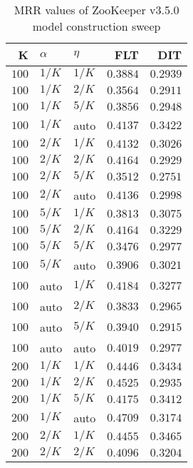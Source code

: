 
\begin{table}
\begin{spacing}{1.2}
\centering
\caption{MRR values of ZooKeeper v3.5.0 model construction sweep}
\label{table:zookeeper_model_sweep}
\vspace{0.2em}
\parbox{.45\linewidth}{\centering \begin{tabular}{rll|rr}
\toprule
    K &  $\alpha$ &    $\eta$ & FLT &   DIT \\
\midrule
$100$ &  $1/K$ &  $1/K$ &         $0.3884$ & $0.2939$ \\
$100$ &  $1/K$ &  $2/K$ &         $0.3564$ & $0.2911$ \\
$100$ &  $1/K$ &  $5/K$ &         $0.3856$ & $0.2948$ \\
$100$ &  $1/K$ &   auto &         $0.4137$ & $0.3422$ \\
$100$ &  $2/K$ &  $1/K$ &         $0.4132$ & $0.3026$ \\
$100$ &  $2/K$ &  $2/K$ &         $0.4164$ & $0.2929$ \\
$100$ &  $2/K$ &  $5/K$ &         $0.3512$ & $0.2751$ \\
$100$ &  $2/K$ &   auto &         $0.4136$ & $0.2998$ \\
$100$ &  $5/K$ &  $1/K$ &         $0.3813$ & $0.3075$ \\
$100$ &  $5/K$ &  $2/K$ &         $0.4164$ & $0.3229$ \\
$100$ &  $5/K$ &  $5/K$ &         $0.3476$ & $0.2977$ \\
$100$ &  $5/K$ &   auto &         $0.3906$ & $0.3021$ \\
$100$ &   auto &  $1/K$ &         $0.4184$ & $0.3277$ \\
$100$ &   auto &  $2/K$ &         $0.3833$ & $0.2965$ \\
$100$ &   auto &  $5/K$ &         $0.3940$ & $0.2915$ \\
$100$ &   auto &   auto &         $0.4019$ & $0.2977$ \\
$200$ &  $1/K$ &  $1/K$ &         $0.4446$ & $0.3434$ \\
$200$ &  $1/K$ &  $2/K$ &         $0.4525$ & $0.2935$ \\
$200$ &  $1/K$ &  $5/K$ &         $0.4175$ & $0.3412$ \\
$200$ &  $1/K$ &   auto &         $0.4709$ & $0.3174$ \\
$200$ &  $2/K$ &  $1/K$ &         $0.4455$ & $0.3465$ \\
$200$ &  $2/K$ &  $2/K$ &         $0.4096$ & $0.3204$ \\

\end{tabular}}
\end{spacing}
\end{table}
